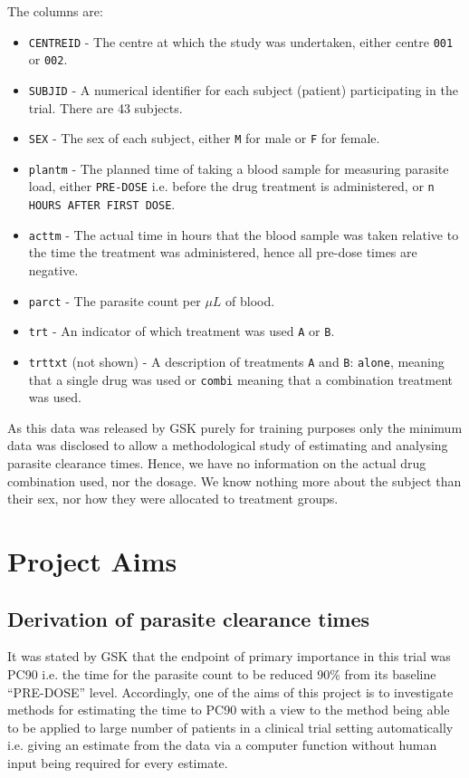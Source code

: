 The columns are:
\begin{itemize}
\item\texttt{CENTREID} - The centre at which the study was undertaken, either centre \texttt{001} or \texttt{002}.
\item\texttt{SUBJID} - A numerical identifier for each subject (patient) participating in the trial. There are 43 subjects.
\item\texttt{SEX} - The sex of each subject, either \texttt{M} for male or \texttt{F} for female.
\item\texttt{plantm} - The planned time of taking a blood sample for measuring parasite load, either \texttt{PRE-DOSE} i.e. before the drug treatment is administered, or \texttt{n HOURS AFTER FIRST DOSE}.
\item\texttt{acttm} - The actual time in hours that the blood sample was taken relative to the time the treatment was administered, hence all pre-dose times are negative.
\item\texttt{parct} - The parasite count per $\mu L$ of blood.
\item\texttt{trt} - An indicator of which treatment was used \texttt{A} or \texttt{B}.
\item\texttt{trttxt} (not shown) - A description of treatments \texttt{A} and \texttt{B}: \texttt{alone}, meaning that a single drug was used or \texttt{combi} meaning that a combination treatment was used.
\end{itemize}

As this data was released by GSK purely for training purposes only the minimum data was disclosed to allow a methodological study of estimating and analysing parasite clearance times. Hence, we have no information on the actual drug combination used, nor the dosage. We know nothing more about the subject than their sex, nor how they were allocated to treatment groups.

\section{Project Aims}
\subsection{Derivation of parasite clearance times}
It was stated by GSK that the endpoint of primary importance in this trial was PC90 i.e. the time for the parasite count to be reduced 90\% from its baseline ``PRE-DOSE'' level. Accordingly, one of the aims of this project is to investigate methods for estimating the time to PC90 with a view to the method being able to be applied to large number of patients in a clinical trial setting automatically i.e. giving an estimate from the data via a computer function without human input being required for every estimate.

